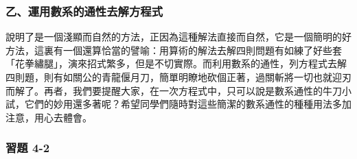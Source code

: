 \subsubsection*{乙、運用數系的通性去解方程式}\label{subsec:4-2-b2}

說明了是一個淺顯而自然的方法，正因為這種解法直接而自然，它是一個簡明的好方法，這裏有一個還算恰當的譬喻：用算術的解法去解四則問題有如練了好些套「花拳繡腿」，演來招式繁多，但是不切實際。而利用數系的通性，列方程式去解四則題，則有如關公的青龍偃月刀，簡單明瞭地砍個正著，過關斬將一切也就迎刃而解了。再者，我們要提醒大家，在一次方程式中，只可以說是數系通性的牛刀小試，它們的妙用還多著呢？希望同學們隨時對這些簡潔的數系通性的種種用法多加注意，用心去體會。

\subsubsection*{習題 4-2}\label{sec:ex4-2}

